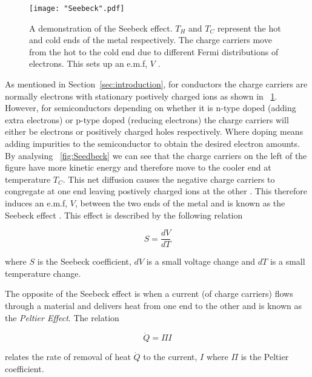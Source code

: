 \documentclass{article}
\newcommand{\figref}[2][\figurename~]{#1\ref{#2}}
\newcommand{\secref}[2][Section~]{#1\ref{#2}}
\begin{document}
\begin{figure}[h]
\centering
\texttt{[image: "Seebeck".pdf]}
\caption{A demonstration of the Seebeck effect. $T_H$ and $T_C$ represent the hot and cold ends of the metal respectively. The charge carriers move from the hot to the cold end due to different Fermi distributions of electrons. This sets up an e.m.f, $V$ \cite{Paper02}.}
\label{fig:Seebeck}
\end{figure}

\vspace{2mm}
\noindent
As mentioned in \secref{sec:introduction}, for conductors the charge carriers are normally electrons with stationary postively charged ions as shown in \figref{fig:Seebeck}. However, for semiconductors depending on whether it is n-type doped (adding extra electrons) or p-type doped (reducing electrons) the charge carriers will either be electrons or positively charged holes respectively. Where doping means adding impurities to the semiconductor to obtain the desired electron amounts. By analysing \figref{fig:Seedbeck} we can see that the charge carriers on the left of the figure have more kinetic energy and therefore move to the cooler end at temperature $T_C$. This net diffusion causes the negative charge carriers to congregate at one end leaving postively charged ions at the other \cite{Paper02}. This therefore induces an e.m.f, $V$, between the two ends of the metal and is known as the Seebeck effect \cite{Paper02}. This effect is described by the following relation \cite{Paper02} 

\begin{equation}
\label{eq:Seebeck-coeff}
S = \frac{dV}{dT}
\end{equation}

\vspace{2mm}
\noindent
where $S$ is the Seebeck coefficient, $dV$ is a small voltage change and $dT$ is a small temperature change. 

\vspace{2mm}
\noindent
The opposite of the Seebeck effect is when a current (of charge carriers) flows through a material and delivers heat from one end to the other and is known as the \textit{Peltier Effect}. The relation

\begin{equation}
\label{eq:Peltier-coeff}
\dot{Q}  = \Pi I
\end{equation}

\vspace{2mm}
\noindent
relates the rate of removal of heat $\dot{Q}$ to the current, $I$ \cite{Paper02} where $\Pi$ is the Peltier coefficient.
\end{document}
